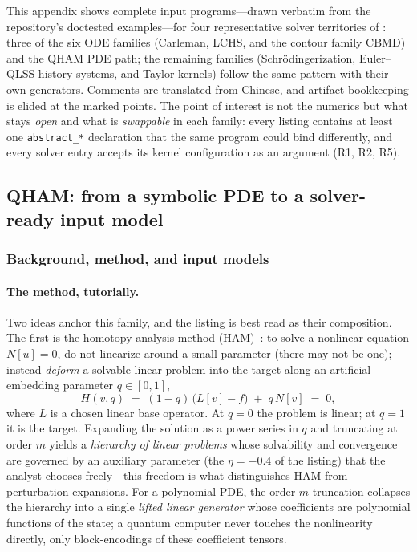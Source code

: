 This appendix shows complete input programs---drawn verbatim from the
repository's doctested examples---for four representative solver
territories of : three of the six ODE families
(Carleman, LCHS, and the contour family CBMD) and the QHAM PDE path; the
remaining families (Schr\"odingerization, Euler--QLSS history systems,
and Taylor kernels) follow the same pattern with their own generators.
Comments are translated from Chinese, and artifact bookkeeping is elided
at the marked points.  The point of
interest is not the numerics but what stays \emph{open} and what is
\emph{swappable} in each family: every listing contains at least one
\texttt{abstract\_*} declaration that the same program could bind
differently, and every solver entry accepts its kernel configuration as an
argument (R1, R2, R5).

\subsection{QHAM: from a symbolic PDE to a solver-ready input model}
\label{app:qham}

\subsubsection{Background, method, and input models}
\label{app:qham-method}

\paragraph{The method, tutorially.}
Two ideas anchor this family, and the listing is best read as their
composition.  The first is the homotopy analysis method
(HAM)~\cite{liao2003beyond,liao2012homotopy}: to solve a nonlinear
equation $N[u]=0$, do not linearize around a small parameter (there may
not be one); instead \emph{deform} a solvable linear problem into the
target along an artificial embedding parameter $q\in[0,1]$,
\[
H(v,q) \;=\; (1-q)\,\bigl(L[v]-f\bigr) \;+\; q\,N[v] \;=\; 0 ,
\]
where $L$ is a chosen linear base operator.  At $q=0$ the problem is
linear; at $q=1$ it is the target.  Expanding the solution as a power
series in $q$ and truncating at order $m$ yields a \emph{hierarchy of
linear problems} whose solvability and convergence are governed by an
auxiliary parameter (the $\eta=-0.4$ of the listing) that the analyst
chooses freely---this freedom is what distinguishes HAM from perturbation
expansions.  For a polynomial PDE, the order-$m$ truncation collapses the
hierarchy into a single \emph{lifted linear generator} whose coefficients
are polynomial functions of the state; a quantum computer never touches
the nonlinearity directly, only block-encodings of these coefficient
tensors.

